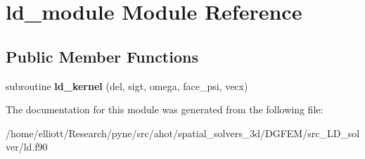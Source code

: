 \hypertarget{classld__module}{\section{ld\-\_\-module Module Reference}
\label{classld__module}
}
\subsection*{Public Member Functions}
\begin{DoxyCompactItemize}
\item 
\hypertarget{classld__module_a7b1e55ba9bbc02396f0a489ad630cfde}{subroutine {\bfseries ld\-\_\-kernel} (del, sigt, omega, face\-\_\-psi, vecx)}\label{classld__module_a7b1e55ba9bbc02396f0a489ad630cfde}

\end{DoxyCompactItemize}


The documentation for this module was generated from the following file\-:\begin{DoxyCompactItemize}
\item 
/home/elliott/\-Research/pyne/src/ahot/spatial\-\_\-solvers\-\_\-3d/\-D\-G\-F\-E\-M/src\-\_\-\-L\-D\-\_\-solver/ld.\-f90\end{DoxyCompactItemize}
